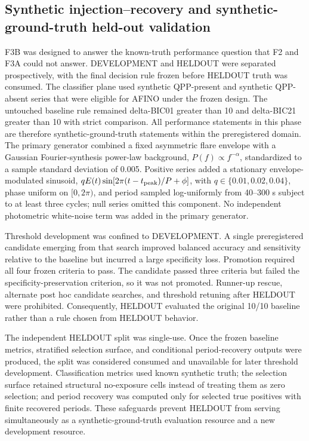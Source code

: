 \documentclass[11pt,a4paper]{article}
\begin{document}
\subsection{Synthetic injection--recovery and synthetic-ground-truth held-out validation}
F3B was designed to answer the known-truth performance question that F2 and F3A could not answer. DEVELOPMENT and HELDOUT were separated prospectively, with the final decision rule frozen before HELDOUT truth was consumed. The classifier plane used synthetic QPP-present and synthetic QPP-absent series that were eligible for AFINO under the frozen design. The untouched baseline rule remained delta-BIC01 greater than 10 and delta-BIC21 greater than 10 with strict comparison. All performance statements in this phase are therefore synthetic-ground-truth statements within the preregistered domain. The primary generator combined a fixed asymmetric flare envelope with a Gaussian Fourier-synthesis power-law background, $P(f)\propto f^{-\alpha}$, standardized to a sample standard deviation of 0.005. Positive series added a stationary envelope-modulated sinusoid, $qE(t)\sin[2\pi(t-t_{\rm peak})/P+\phi]$, with $q\in\{0.01,0.02,0.04\}$, phase uniform on $[0,2\pi)$, and period sampled log-uniformly from 40--300 s subject to at least three cycles; null series omitted this component. No independent photometric white-noise term was added in the primary generator.

Threshold development was confined to DEVELOPMENT. A single preregistered candidate emerging from that search improved balanced accuracy and sensitivity relative to the baseline but incurred a large specificity loss. Promotion required all four frozen criteria to pass. The candidate passed three criteria but failed the specificity-preservation criterion, so it was not promoted. Runner-up rescue, alternate post hoc candidate searches, and threshold retuning after HELDOUT were prohibited. Consequently, HELDOUT evaluated the original 10/10 baseline rather than a rule chosen from HELDOUT behavior.

The independent HELDOUT split was single-use. Once the frozen baseline metrics, stratified selection surface, and conditional period-recovery outputs were produced, the split was considered consumed and unavailable for later threshold development. Classification metrics used known synthetic truth; the selection surface retained structural no-exposure cells instead of treating them as zero selection; and period recovery was computed only for selected true positives with finite recovered periods. These safeguards prevent HELDOUT from serving simultaneously as a synthetic-ground-truth evaluation resource and a new development resource.
\end{document}
